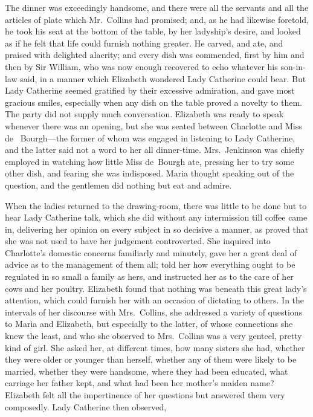 The dinner was exceedingly handsome, and there were all the
servants and all the articles of plate which Mr.\ Collins had
promised; and, as he had likewise foretold, he took his seat at
the bottom of the table, by her ladyship's desire, and looked as
if he felt that life could furnish nothing greater.  He carved,
and ate, and praised with delighted alacrity; and every dish was
commended, first by him and then by Sir William, who was now
enough recovered to echo whatever his son-in-law said, in a
manner which Elizabeth wondered Lady Catherine could bear.
But Lady Catherine seemed gratified by their excessive admiration,
and gave most gracious smiles, especially when any dish on the
table proved a novelty to them.  The party did not supply much
conversation.  Elizabeth was ready to speak whenever there was
an opening, but she was seated between Charlotte and Miss de~%
Bourgh---the former of whom was engaged in listening to Lady
Catherine, and the latter said not a word to her all dinner-time.
Mrs.\ Jenkinson was chiefly employed in watching how little Miss
de~Bourgh ate, pressing her to try some other dish, and fearing
she was indisposed.  Maria thought speaking out of the question,
and the gentlemen did nothing but eat and admire.

When the ladies returned to the drawing-room, there was little
to be done but to hear Lady Catherine talk, which she did
without any intermission till coffee came in, delivering her
opinion on every subject in so decisive a manner, as proved
that she was not used to have her judgement controverted.  She
inquired into Charlotte's domestic concerns familiarly and
minutely, gave her a great deal of advice as to the management
of them all; told her how everything ought to be regulated in so
small a family as hers, and instructed her as to the care of her
cows and her poultry.  Elizabeth found that nothing was beneath
this great lady's attention, which could furnish her with an
occasion of dictating to others.  In the intervals of her discourse
with Mrs.\ Collins, she addressed a variety of questions to Maria
and Elizabeth, but especially to the latter, of whose connections
she knew the least, and who she observed to Mrs.\ Collins was a
very genteel, pretty kind of girl.  She asked her, at different
times, how many sisters she had, whether they were older or
younger than herself, whether any of them were likely to be
married, whether they were handsome, where they had been
educated, what carriage her father kept, and what had been her
mother's maiden name?  Elizabeth felt all the impertinence of her
questions but answered them very composedly.  Lady Catherine
then observed,

